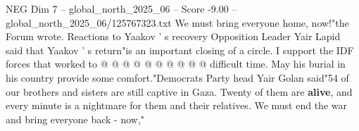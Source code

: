 \begin{textsample}{NEG Dim 7 – global\_north\_2025\_06 – Score -9.00 – global\_north\_2025\_06/125767323.txt}
We must bring everyone home, now!"the Forum wrote.
Reactions to Yaakov ' s recovery Opposition Leader Yair Lapid said that Yaakov ' s return"is an important closing of a circle.
I support the IDF forces that worked to @ @ @ @ @ @ @ @ @ @ difficult time.
May his burial in his country provide some comfort."Democrats Party head Yair Golan said"54 of our brothers and sisters are still captive in Gaza.
Twenty of them are \textbf{alive}, and every minute is a nightmare for them and their relatives.
We must end the war and bring everyone back - now,"

\end{textsample}
